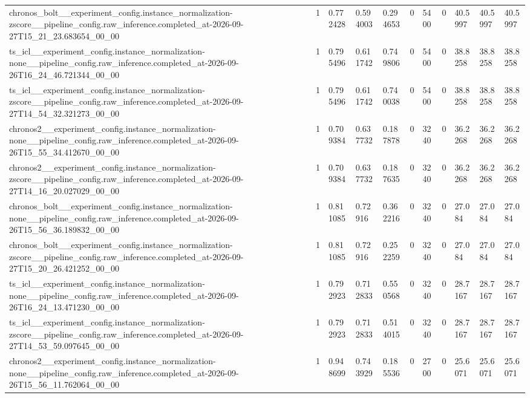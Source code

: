 \begin{tabular}{lllllllllll}
chronos\_bolt\_\_experiment\_config.instance\_normalization-zscore\_\_pipeline\_config.raw\_inference.completed\_at-2026-09-27T15\_21\_23.683654\_00\_00 & 1 & 0.772428 & 0.594003 & 0.294653 & 0 & 5400 & 0 & 40.5997 & 40.5997 & 40.5997 \\
ts\_icl\_\_experiment\_config.instance\_normalization-none\_\_pipeline\_config.raw\_inference.completed\_at-2026-09-26T16\_24\_46.721344\_00\_00 & 1 & 0.795496 & 0.611742 & 0.749806 & 0 & 5400 & 0 & 38.8258 & 38.8258 & 38.8258 \\
ts\_icl\_\_experiment\_config.instance\_normalization-zscore\_\_pipeline\_config.raw\_inference.completed\_at-2026-09-27T14\_54\_32.321273\_00\_00 & 1 & 0.795496 & 0.611742 & 0.740038 & 0 & 5400 & 0 & 38.8258 & 38.8258 & 38.8258 \\
chronos2\_\_experiment\_config.instance\_normalization-none\_\_pipeline\_config.raw\_inference.completed\_at-2026-09-26T15\_55\_34.412670\_00\_00 & 1 & 0.709384 & 0.637732 & 0.187878 & 0 & 3240 & 0 & 36.2268 & 36.2268 & 36.2268 \\
chronos2\_\_experiment\_config.instance\_normalization-zscore\_\_pipeline\_config.raw\_inference.completed\_at-2026-09-27T14\_16\_20.027029\_00\_00 & 1 & 0.709384 & 0.637732 & 0.187635 & 0 & 3240 & 0 & 36.2268 & 36.2268 & 36.2268 \\
chronos\_bolt\_\_experiment\_config.instance\_normalization-none\_\_pipeline\_config.raw\_inference.completed\_at-2026-09-26T15\_56\_36.189832\_00\_00 & 1 & 0.811085 & 0.72916 & 0.362216 & 0 & 3240 & 0 & 27.084 & 27.084 & 27.084 \\
chronos\_bolt\_\_experiment\_config.instance\_normalization-zscore\_\_pipeline\_config.raw\_inference.completed\_at-2026-09-27T15\_20\_26.421252\_00\_00 & 1 & 0.811085 & 0.72916 & 0.252259 & 0 & 3240 & 0 & 27.084 & 27.084 & 27.084 \\
ts\_icl\_\_experiment\_config.instance\_normalization-none\_\_pipeline\_config.raw\_inference.completed\_at-2026-09-26T16\_24\_13.471230\_00\_00 & 1 & 0.792923 & 0.712833 & 0.550568 & 0 & 3240 & 0 & 28.7167 & 28.7167 & 28.7167 \\
ts\_icl\_\_experiment\_config.instance\_normalization-zscore\_\_pipeline\_config.raw\_inference.completed\_at-2026-09-27T14\_53\_59.097645\_00\_00 & 1 & 0.792923 & 0.712833 & 0.514015 & 0 & 3240 & 0 & 28.7167 & 28.7167 & 28.7167 \\
chronos2\_\_experiment\_config.instance\_normalization-none\_\_pipeline\_config.raw\_inference.completed\_at-2026-09-26T15\_56\_11.762064\_00\_00 & 1 & 0.948699 & 0.743929 & 0.185536 & 0 & 2700 & 0 & 25.6071 & 25.6071 & 25.6071 \\

\end{tabular}

